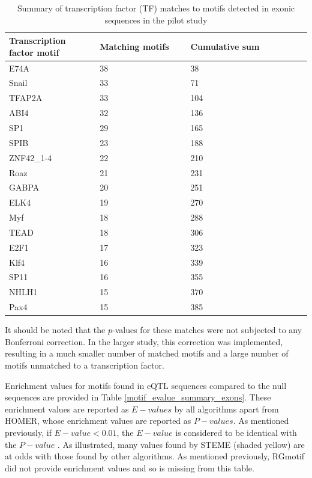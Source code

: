 \documentclass[12pt]{article}
\begin{document}
\begin{table}[!ht]
\centering
\caption{Summary of transcription factor (TF) matches to motifs detected in exonic sequences in the pilot study}\label{fig: motif_tf_summary_exons}
\begin{tabular}{p{0.3\linewidth}p{0.3\linewidth}p{0.3\linewidth}p{0.4\linewidth}}
\toprule[0.2em]
Transcription factor motif & Matching motifs & Cumulative sum\\ 
\midrule[0.1em]
E74A & 38 & 38 \\
Snail & 33 & 71\\
TFAP2A & 33 & 104\\
ABI4 & 32 & 136\\
SP1 & 29 & 165\\
SPIB & 23 & 188\\
ZNF42{\_}1-4 & 22 & 210\\
Roaz & 21 & 231\\
GABPA & 20 & 251\\
ELK4 & 19 & 270\\
Myf & 18 & 288\\
TEAD & 18 & 306\\
E2F1 & 17 & 323\\
Klf4 & 16 & 339\\
SP11 & 16 & 355\\
NHLH1 & 15 & 370\\
Pax4 & 15 & 385\\
\bottomrule[0.2em]
\end{tabular}
\end{table} 

 
It should be noted that the $p$-values for these matches were not subjected to any Bonferroni correction. In the larger study, this correction was implemented, resulting in a much smaller number of matched motifs and a large number of motifs unmatched to a transcription factor.

Enrichment values for motifs found in eQTL sequences compared to the null sequences are provided in Table \ref{motif_evalue_summary_exons}. These enrichment values are reported as $E-values$ by all algorithms apart from HOMER, whose enrichment values are reported as $P-values$. As mentioned previously, if $E-value < 0.01$, the $E-value$ is considered to be identical with the $P-value$ \citep{Altschul}. As illustrated, many values found by STEME (shaded yellow) are at odds with those found by other algorithms. As mentioned previously, RGmotif did not provide enrichment values and so is missing from this table. 
\end{document}

